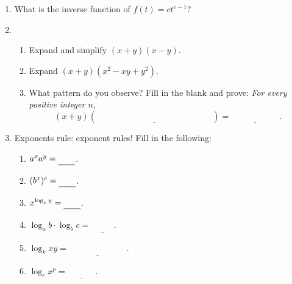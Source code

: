 \documentclass{ks}
\begin{document}
\begin{enumerate}
  \item What is the inverse function of \(f(t) = c t^{c-1}\)?

  \item
    \begin{enumerate}
      \item Expand and simplify \((x+y)(x-y)\).
      \item Expand \((x+y)(x^2-xy+y^2)\).
      \item What pattern do you observe?  Fill in the blank and prove: \emph{For
        every positive integer \(n\)},
        \[
          (x+y)
          (\underline{\phantom{x^n - x^{n-1} y + x^{n-2} y^2 - \dotsb \pm y^n}})
          = \underline{\phantom{x^{n+1} - y^{n+1}}}.
        \]

    \end{enumerate}

  \item Exponents rule: exponent rules!  Fill in the following:
    \begin{multicols}{3}
      \begin{enumerate}
        \item \(a^x a^y = \underline{\mathstrut\qquad}\).
        \item \((b^x)^c = \underline{\mathstrut\qquad}\).
        \item \(x^{\log_x y} = \underline{\mathstrut\qquad}\).
        \item \(\log_a b \cdot \log_b c = \underline{\phantom{\log_a c}}\).
        \item \(\log_k xy = \underline{\phantom{\log_k x + \log_k y}}\).
        \item \(\log_c x^p = \underline{\phantom{p \log_c x}}\).
      \end{enumerate}
    \end{multicols}

\end{enumerate}
\end{document}
